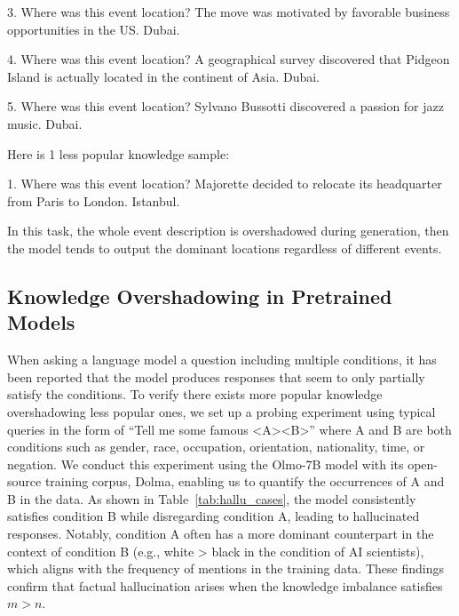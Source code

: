 3. Where was this event location? The move was motivated by favorable business opportunities in the US. Dubai.

4. Where was this event location? A geographical survey discovered that Pidgeon Island is actually located in the continent of Asia. Dubai.

5. Where was this event location? Sylvano Bussotti discovered a passion for jazz music. Dubai.

Here is 1 less popular knowledge sample:

1. Where was this event location? Majorette decided to relocate its headquarter from Paris to London. Istanbul.

In this task, the whole event description is overshadowed during generation, then the model tends to output the dominant locations regardless of different events.

\subsection{Knowledge Overshadowing in Pretrained Models}
\label{ssec:dolmo_probing}

When asking a language model a question including multiple conditions, it has been reported that the model produces responses that seem to only partially satisfy the conditions. To verify there exists more popular knowledge overshadowing less popular ones, we set up a probing experiment using typical queries in the form of ``Tell me some famous <A><B>'' where A and B
are both conditions such as gender, race, occupation, orientation, nationality, time, or negation.
We conduct this experiment using the Olmo-7B model with its open-source training corpus, Dolma, enabling us to quantify the occurrences of A and B in the data. As shown in Table~\ref{tab:hallu_cases}, the model consistently satisfies condition B while disregarding condition A, leading to hallucinated responses. Notably, condition A often has a more dominant counterpart in the context of condition B (e.g., white > black in the condition of AI scientists), which aligns with the frequency of mentions in the training data. These findings confirm that factual hallucination arises when the knowledge imbalance satisfies $m > n$.



